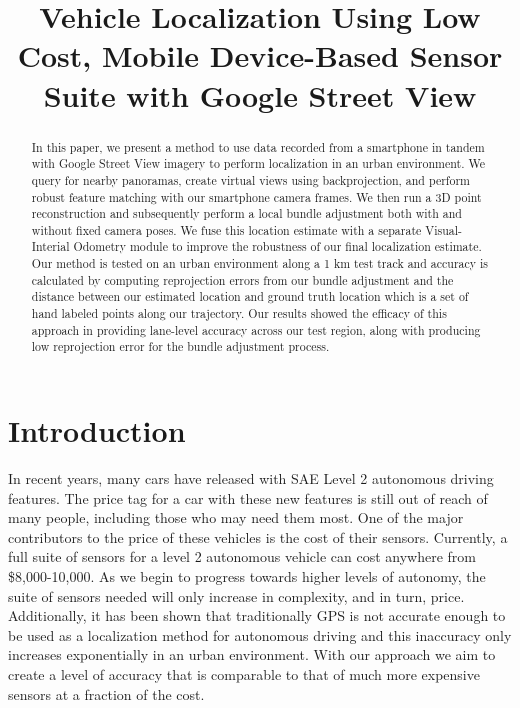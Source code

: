 \documentclass[conference]{IEEEtran}
\begin{document}
\title{Vehicle Localization Using Low Cost, Mobile Device-Based Sensor Suite with Google Street View\\
}

\author{

\and
{}

\and
{}

\and
{}

\and
{}

}

\maketitle

\begin{abstract}
In this paper, we present a method to use data recorded from a smartphone in tandem with Google Street View imagery to perform localization in an urban environment. We query for nearby panoramas, create virtual views using backprojection, and perform robust feature matching with our smartphone camera frames. We then run a 3D point reconstruction and subsequently perform a local bundle adjustment both with and without fixed camera poses. We fuse this location estimate with a separate Visual-Interial Odometry module to improve the robustness of our final localization estimate. Our method is tested on an urban environment along a 1 km test track and accuracy is calculated by computing reprojection errors from our bundle adjustment and the distance between our estimated location and ground truth location which is a set of hand labeled points along our trajectory. Our results showed the efficacy of this approach in providing lane-level accuracy across our test region, along with producing low reprojection error for the bundle adjustment process.
\end{abstract}



\section{Introduction}
In recent years, many cars have released with SAE Level 2 autonomous driving features. The price tag for a car with these new features is still out of reach of many people, including those who may need them most. One of the major contributors to the price of these vehicles is the cost of their sensors. Currently, a full suite of sensors for a level 2 autonomous vehicle can cost anywhere from \$8,000-10,000\cite{sensorcost}. As we begin to progress towards higher levels of autonomy, the suite of sensors needed will only increase in complexity, and in turn, price. Additionally, it has been shown that traditionally GPS is not accurate enough to be used as a localization method for autonomous driving and this inaccuracy only increases exponentially in an urban environment. With our approach we aim to create a level of accuracy that is comparable to that of much more expensive sensors at a fraction of the cost. 
\end{document}
